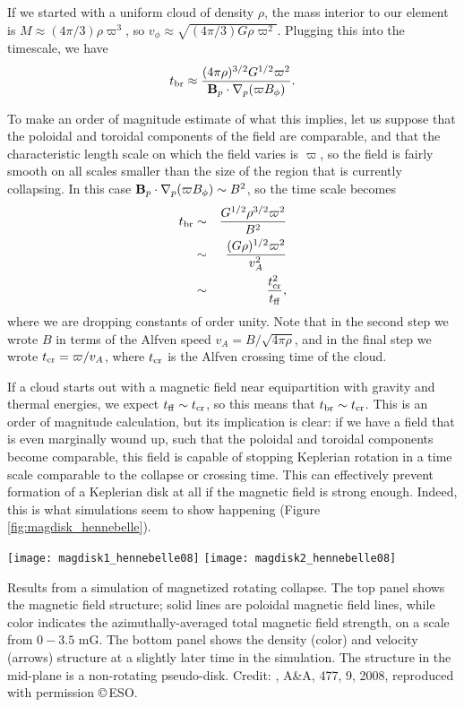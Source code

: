 If we started with a uniform cloud of density $\rho$, the mass interior to our element is $M\approx (4\pi/3) \rho \varpi^3$, so $v_\phi \approx \sqrt{(4\pi/3) G \rho \varpi^2}$. Plugging this into the timescale, we have
\begin{equation}
t_{\rm br} \approx \frac{(4\pi \rho)^{3/2} G^{1/2} \varpi^2}{\mathbf{B}_p \cdot\nabla_p (\varpi B_\phi)}.
\end{equation}

To make an order of magnitude estimate of what this implies, let us suppose that the poloidal and toroidal components of the field are comparable, and that the characteristic length scale on which the field varies is $\varpi$, so the field is fairly smooth on all scales smaller than the size of the region that is currently collapsing. In this case $\mathbf{B}_p \cdot \nabla_p (\varpi B_\phi) \sim B^2$, so the time scale becomes
\begin{eqnarray}
t_{\rm br} & \sim & \frac{G^{1/2}\rho^{3/2} \varpi^2}{B^2} \\
& \sim & \frac{(G\rho)^{1/2} \varpi^2}{v_A^2} \\
& \sim & \frac{t_{\rm cr}^2}{t_{\rm ff}},
\end{eqnarray}
where we are dropping constants of order unity. Note that in the second step we wrote $B$ in terms of the Alfven speed $v_A = B/\sqrt{4\pi \rho}$, and in the final step we wrote $t_{\rm cr} = \varpi/v_A$, where $t_{\rm cr}$ is the Alfven crossing time of the cloud.

If a cloud starts out with a magnetic field near equipartition with gravity and thermal energies, we expect $t_{\rm ff} \sim t_{\rm cr}$, so this means that $t_{\rm br}\sim t_{\rm cr}$. This is an order of magnitude calculation, but its implication is clear: if we have a field that is even marginally wound up, such that the poloidal and toroidal components become comparable, this field is capable of stopping Keplerian rotation in a time scale comparable to the collapse or crossing time. This can effectively prevent formation of a Keplerian disk at all if the magnetic field is strong enough. Indeed, this is what simulations seem to show happening (Figure \ref{fig:magdisk_hennebelle}).

\begin{marginfigure}
\texttt{[image: magdisk1\_hennebelle08]}
\texttt{[image: magdisk2\_hennebelle08]}
\caption[Simulations of magnetized rotating collapse]{
\label{fig:magdisk_hennebelle}
Results from a simulation of magnetized rotating collapse. The top panel shows the magnetic field structure; solid lines are poloidal magnetic field lines, while color indicates the azimuthally-averaged total magnetic field strength, on a scale from $0-3.5$ mG. The bottom panel shows the density (color) and velocity (arrows) structure at a slightly later time in the simulation. The structure in the mid-plane is a non-rotating pseudo-disk. Credit:  \citeauthor{hennebelle08c}, A\&A, 477, 9, 2008, reproduced with
permission \copyright\,ESO.
}
\end{marginfigure}

